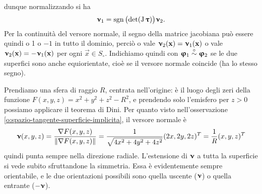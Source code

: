 dunque normalizzando si ha
\begin{equation}
	\bm{\upnu}_1=\operatorname{sgn}\big(\!\det(\operatorname{J}\bm{\uptau})\big)\bm{\upnu}_2.
	\label{eq:versore-normale-riparametrizzazione}
\end{equation}
Per la continuità del versore normale, il segno della matrice jacobiana può essere quindi o 1 o $-1$ in tutto il dominio, perciò o vale $\bm{\upnu}_2(\mathbf{x})=\bm{\upnu}_1(\mathbf{x})$ o vale $\bm{\upnu}_2(\mathbf{x})=-\bm{\upnu}_1(\mathbf{x})$ per ogni $\vec x\in S_\circ$.
Indichiamo quindi con $\bm{\upvarphi}_1\overset{\circ}{\sim}\bm{\upvarphi}_2$ se le due superfici sono anche equiorientate, cioè se il versore normale coincide (ha lo stesso segno).
\begin{esempio} \label{es:versore-normale-sfera}
	Prendiamo una sfera di raggio $R$, centrata nell'origine: è il luogo degli zeri della funzione $F(x,y,z)=x^2+y^2+z^2-R^2$, e prendendo solo l'emisfero per $z>0$ possiamo applicare il teorema di Dini.
	Per quanto visto nell'osservazione \ref{o:spazio-tangente-superficie-implicita}, il versore normale è
	\begin{equation}
		\bm{\upnu}(x,y,z)=\frac{\nabla F(x,y,z)}{\lVert\nabla F(x,y,z)\rVert}=\frac1{\sqrt{4x^2+4y^2+4z^2}}(2x,2y,2z)^T=\frac1{R}(x,y,z)^T
	\end{equation}
	quindi punta sempre nella direzione radiale.
	L'estensione di $\bm{\upnu}$ a tutta la superficie si vede subito sfruttandone la simmetria.
	Essa è evidentemente sempre orientabile, e le due orientazioni possibili sono quella uscente ($\bm{\upnu}$) o quella entrante ($-\bm{\upnu}$).
\end{esempio}
